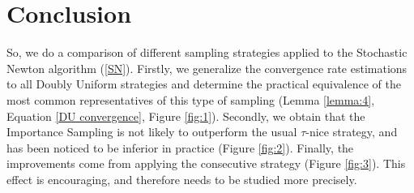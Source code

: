 \documentclass{article}
\theoremstyle{definition}
\theoremstyle{assumption}
\theoremstyle{lemma}
\theoremstyle{theorem}
\theoremstyle{proposition}
\begin{document}
	\section{Conclusion}
	So, we do a comparison of different sampling strategies applied to the Stochastic Newton algorithm (\ref{SN}). Firstly, we generalize the convergence rate estimations to all Doubly Uniform strategies and determine the practical equivalence of the most common representatives of this type of sampling (Lemma \ref{lemma:4}, Equation \ref{DU convergence}, Figure \ref{fig:1}). Secondly, we obtain that the Importance Sampling is not likely to outperform the usual $\tau$-nice strategy, and has been noticed to be inferior in practice (Figure \ref{fig:2}). Finally, the improvements come from applying the consecutive strategy (Figure \ref{fig:3}). This effect is encouraging, and therefore needs to be studied more precisely.
	
	
\renewcommand\refname{References}	


\end{document}
